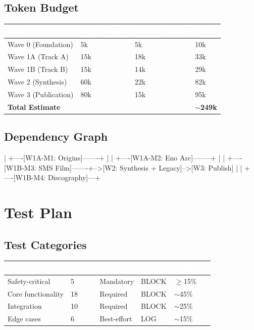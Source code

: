 \documentclass[11pt,letterpaper]{article}
\newcommand{\tableheader}[1]{\textbf{\sffamily\textcolor{white}{#1}}}
\begin{document}
\subsection{Token Budget}

\begin{center}
\begin{tabularx}{\textwidth}{L{3.5cm}C{2cm}C{2cm}C{2cm}}
\toprule
{}
\tableheader{Wave} & \tableheader{Input Tokens} & \tableheader{Output Tokens} & \tableheader{Total} \\
\midrule
Wave 0 (Foundation) & 5k & 5k & 10k \\
Wave 1A (Track A) & 15k & 18k & 33k \\
Wave 1B (Track B) & 15k & 14k & 29k \\
Wave 2 (Synthesis) & 60k & 22k & 82k \\
Wave 3 (Publication) & 80k & 15k & 95k \\
\midrule
\textbf{Total Estimate} & & & \textbf{$\sim$249k} \\
\bottomrule
\end{tabularx}
\end{center}

\subsection{Dependency Graph}

\begin{asciibox}
  [W0: Foundation]
       |
       +----[W1A-M1: Origins]-------+
       |                             |
       +----[W1A-M2: Eno Arc]--------+
       |                             |
       +----[W1B-M3: SMS Film]-------+-->[W2: Synthesis + Legacy]-->[W3: Publish]
       |                             |
       +----[W1B-M4: Discography]---+
\end{asciibox}

\section{Test Plan}

\subsection{Test Categories}

\begin{center}
\begin{tabularx}{\textwidth}{L{3cm}C{1.5cm}L{2.5cm}L{2cm}X}
\toprule
{}
\tableheader{Category} & \tableheader{Count} & \tableheader{Priority} & \tableheader{On Fail} & \tableheader{Target \%} \\
\midrule
Safety-critical & 5 & Mandatory & BLOCK & $\ge$15\% \\
Core functionality & 18 & Required & BLOCK & $\sim$45\% \\
Integration & 10 & Required & BLOCK & $\sim$25\% \\
Edge cases & 6 & Best-effort & LOG & $\sim$15\% \\
\bottomrule
\end{tabularx}
\end{center}
\end{document}
